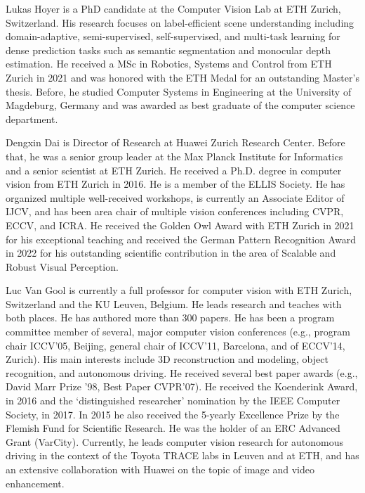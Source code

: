\documentclass[journal,compsoc]{IEEEtran}
\begin{document}
\begin{IEEEbiography}{Lukas Hoyer} is a PhD candidate at the Computer Vision Lab at ETH Zurich, Switzerland. His research focuses on label-efficient scene understanding including domain-adaptive, semi-supervised, self-supervised, and multi-task learning for dense prediction tasks such as semantic segmentation and monocular depth estimation. 
He received a MSc in Robotics, Systems and Control from ETH Zurich in 2021 and was honored with the ETH Medal for an outstanding Master's thesis. Before, he studied Computer Systems in Engineering at the University of Magdeburg, Germany and was awarded as best graduate of the computer science department.
\end{IEEEbiography}

\begin{IEEEbiography}{Dengxin Dai} is Director of Research at Huawei Zurich Research Center. Before that, he was a senior group leader at the Max Planck Institute for Informatics and a senior scientist at ETH Zurich. He
received a Ph.D. degree in computer
vision from ETH Zurich in 2016. He is a member of the ELLIS Society. He has organized multiple well-received workshops, is currently an Associate Editor of IJCV, and has been area chair of multiple vision conferences including CVPR, ECCV, and ICRA. He received the Golden Owl Award with ETH Zurich in 2021 for his exceptional teaching and received the German Pattern Recognition Award in 2022 for his outstanding scientific contribution in the area of Scalable and Robust Visual Perception.
\end{IEEEbiography}

\begin{IEEEbiography}{Luc Van Gool}
is currently a full professor for computer vision with ETH Zurich, Switzerland and the
KU Leuven, Belgium. He leads research and
teaches with both places. He has authored more
than 300 papers. He has been a program committee member of several, major computer vision conferences (e.g., program chair ICCV’05, Beijing,
general chair of ICCV’11, Barcelona, and of
ECCV’14, Zurich). His main interests include 3D
reconstruction and modeling, object recognition,
and autonomous driving. He received several best
paper awards (e.g., David Marr Prize ’98, Best Paper CVPR’07). He
received the Koenderink Award, in 2016 and the ‘distinguished researcher’
nomination by the IEEE Computer Society, in 2017. In 2015 he also
received the 5-yearly Excellence Prize by the Flemish Fund for Scientific
Research. He was the holder of an ERC Advanced Grant (VarCity). Currently, he leads computer vision research for autonomous driving in the context of the Toyota TRACE labs in Leuven and at ETH, and has an extensive
collaboration with Huawei on the topic of image and video enhancement.
\end{IEEEbiography}

 



 



\vfill
\end{document}
